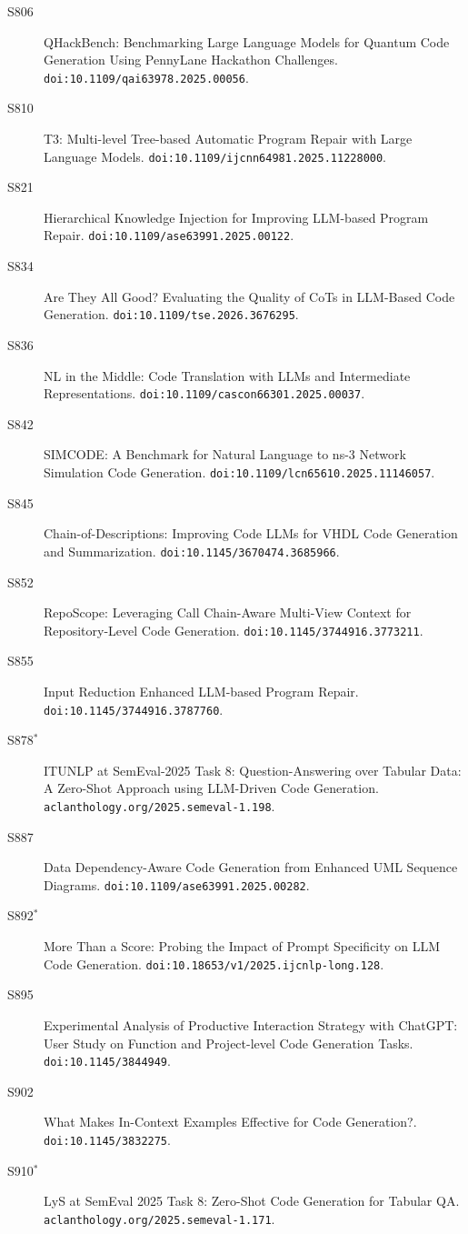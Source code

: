 {\begin{description}
\item[S806] QHackBench: Benchmarking Large Language Models for Quantum Code Generation Using PennyLane Hackathon Challenges. \texttt{doi:10.1109/qai63978.2025.00056}.
\item[S810] T3: Multi-level Tree-based Automatic Program Repair with Large Language Models. \texttt{doi:10.1109/ijcnn64981.2025.11228000}.
\item[S821] Hierarchical Knowledge Injection for Improving LLM-based Program Repair. \texttt{doi:10.1109/ase63991.2025.00122}.
\item[S834] Are They All Good? Evaluating the Quality of CoTs in LLM-Based Code Generation. \texttt{doi:10.1109/tse.2026.3676295}.
\item[S836] NL in the Middle: Code Translation with LLMs and Intermediate Representations. \texttt{doi:10.1109/cascon66301.2025.00037}.
\item[S842] SIMCODE: A Benchmark for Natural Language to ns-3 Network Simulation Code Generation. \texttt{doi:10.1109/lcn65610.2025.11146057}.
\item[S845] Chain-of-Descriptions: Improving Code LLMs for VHDL Code Generation and Summarization. \texttt{doi:10.1145/3670474.3685966}.
\item[S852] RepoScope: Leveraging Call Chain-Aware Multi-View Context for Repository-Level Code Generation. \texttt{doi:10.1145/3744916.3773211}.
\item[S855] Input Reduction Enhanced LLM-based Program Repair. \texttt{doi:10.1145/3744916.3787760}.
\item[S878$^\ast$] ITUNLP at SemEval-2025 Task 8: Question-Answering over Tabular Data: A Zero-Shot Approach using LLM-Driven Code Generation. \texttt{aclanthology.org/2025.semeval-1.198}.
\item[S887] Data Dependency-Aware Code Generation from Enhanced UML Sequence Diagrams. \texttt{doi:10.1109/ase63991.2025.00282}.
\item[S892$^\ast$] More Than a Score: Probing the Impact of Prompt Specificity on LLM Code Generation. \texttt{doi:10.18653/v1/2025.ijcnlp-long.128}.
\item[S895] Experimental Analysis of Productive Interaction Strategy with ChatGPT: User Study on Function and Project-level Code Generation Tasks. \texttt{doi:10.1145/3844949}.
\item[S902] What Makes In-Context Examples Effective for Code Generation?. \texttt{doi:10.1145/3832275}.
\item[S910$^\ast$] LyS at SemEval 2025 Task 8: Zero-Shot Code Generation for Tabular QA. \texttt{aclanthology.org/2025.semeval-1.171}.

\end{description}}
